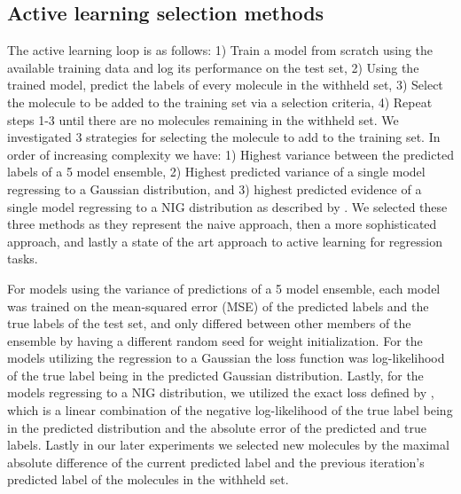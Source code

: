 \documentclass[journal=jmcmar,manuscript=article]{achemso}
\begin{document}
\subsection{Active learning selection methods}
The active learning loop is as follows: 1) Train a model from scratch using the available training data and log its performance on the test set, 2) Using the trained model, predict the labels of every molecule in the withheld set, 3) Select the molecule to be added to the training set via a selection criteria, 4) Repeat steps 1-3 until there are no molecules remaining in the withheld set. We investigated 3 strategies for selecting the molecule to add to the training set. In order of increasing complexity we have: 1) Highest variance between the predicted labels of a 5 model ensemble, 2) Highest predicted variance of a single model regressing to a Gaussian distribution, and 3) highest predicted evidence of a single model regressing to a NIG distribution as described by \citet{alnigregress}. We selected these three methods as they represent the naive approach, then a more sophisticated approach, and lastly a state of the art approach to active learning for regression tasks.

For models using the variance of predictions of a 5 model ensemble, each model was trained on the mean-squared error (MSE) of the predicted labels and the true labels of the test set, and only differed between other members of the ensemble by having a different random seed for weight initialization. For the models utilizing the regression to a Gaussian the loss function was log-likelihood of the true label being in the predicted Gaussian distribution. Lastly, for the models regressing to a NIG distribution, we utilized the exact loss defined by \citet{alnigregress}, which is a linear combination of the negative log-likelihood of the true label being in the predicted distribution and the absolute error of the predicted and true labels. Lastly in our later experiments we selected new molecules by the maximal absolute difference of the current predicted label and the previous iteration's predicted label of the molecules in the withheld set.
\end{document}
